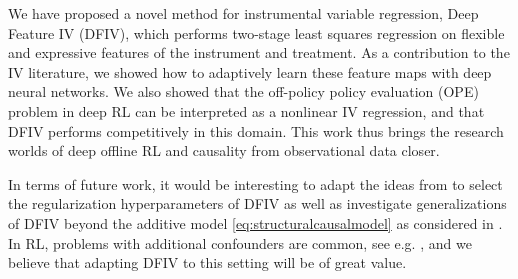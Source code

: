 
We have proposed a novel method for instrumental variable regression, Deep Feature IV (DFIV), which performs two-stage least squares regression on flexible and expressive features of the instrument and treatment. As a contribution to the IV literature, we showed how to adaptively learn these feature maps with deep neural networks. We also showed that the off-policy policy evaluation (OPE) problem in deep RL can be interpreted as a nonlinear IV regression, and that DFIV performs competitively in this domain. This work thus brings the research worlds of deep offline RL and causality from observational data closer.

In terms of future work, it would be interesting to adapt the ideas from \citep{angrist1995split,angrist1999jackknife,hansen2014instrumental} to select the regularization hyperparameters of DFIV as well as investigate generalizations of DFIV beyond the additive model \eqref{eq:structuralcausalmodel} as considered in \citep[Section 5.5]{Carrasco2007}. In RL, problems with additional confounders are common, see e.g. \citep{namkoong2020off,shang2019environment}, and we believe that adapting DFIV to this setting will be of great value.

